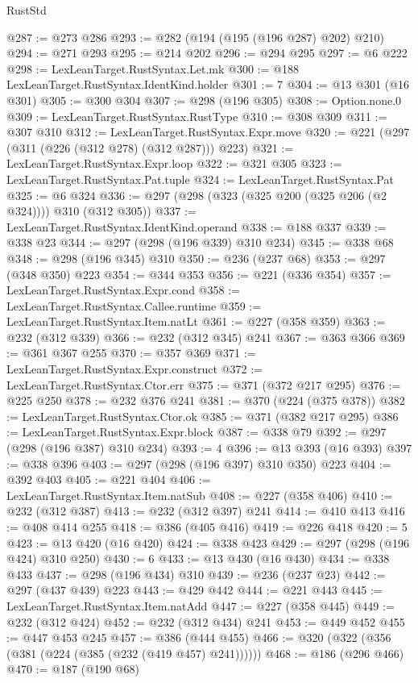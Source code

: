 \begin{lexlean}{RustStd}
\begin{coremodule}
@287 := @273 @286
@293 := @282 (@194 (@195 (@196 @287) @202) @210)
@294 := @271 @293
@295 := @214 @202
@296 := @294 @295
@297 := @6 @222
@298 := LexLeanTarget.RustSyntax.Let.mk
@300 := @188 LexLeanTarget.RustSyntax.IdentKind.holder
@301 := 7
@304 := @13 @301 (@16 @301)
@305 := @300 @304
@307 := @298 (@196 @305)
@308 := Option.none.{0}
@309 := LexLeanTarget.RustSyntax.RustType
@310 := @308 @309
@311 := @307 @310
@312 := LexLeanTarget.RustSyntax.Expr.move
@320 := @221 (@297 (@311 (@226 (@312 @278) (@312 @287))) @223)
@321 := LexLeanTarget.RustSyntax.Expr.loop
@322 := @321 @305
@323 := LexLeanTarget.RustSyntax.Pat.tuple
@324 := LexLeanTarget.RustSyntax.Pat
@325 := @6 @324
@336 := @297 (@298 (@323 (@325 @200 (@325 @206 (@2 @324)))) @310 (@312 @305))
@337 := LexLeanTarget.RustSyntax.IdentKind.operand
@338 := @188 @337
@339 := @338 @23
@344 := @297 (@298 (@196 @339) @310 @234)
@345 := @338 @68
@348 := @298 (@196 @345) @310
@350 := @236 (@237 @68)
@353 := @297 (@348 @350) @223
@354 := @344 @353
@356 := @221 (@336 @354)
@357 := LexLeanTarget.RustSyntax.Expr.cond
@358 := LexLeanTarget.RustSyntax.Callee.runtime
@359 := LexLeanTarget.RustSyntax.Item.natLt
@361 := @227 (@358 @359)
@363 := @232 (@312 @339)
@366 := @232 (@312 @345) @241
@367 := @363 @366
@369 := @361 @367 @255
@370 := @357 @369
@371 := LexLeanTarget.RustSyntax.Expr.construct
@372 := LexLeanTarget.RustSyntax.Ctor.err
@375 := @371 (@372 @217 @295)
@376 := @225 @250
@378 := @232 @376 @241
@381 := @370 (@224 (@375 @378))
@382 := LexLeanTarget.RustSyntax.Ctor.ok
@385 := @371 (@382 @217 @295)
@386 := LexLeanTarget.RustSyntax.Expr.block
@387 := @338 @79
@392 := @297 (@298 (@196 @387) @310 @234)
@393 := 4
@396 := @13 @393 (@16 @393)
@397 := @338 @396
@403 := @297 (@298 (@196 @397) @310 @350) @223
@404 := @392 @403
@405 := @221 @404
@406 := LexLeanTarget.RustSyntax.Item.natSub
@408 := @227 (@358 @406)
@410 := @232 (@312 @387)
@413 := @232 (@312 @397) @241
@414 := @410 @413
@416 := @408 @414 @255
@418 := @386 (@405 @416)
@419 := @226 @418
@420 := 5
@423 := @13 @420 (@16 @420)
@424 := @338 @423
@429 := @297 (@298 (@196 @424) @310 @250)
@430 := 6
@433 := @13 @430 (@16 @430)
@434 := @338 @433
@437 := @298 (@196 @434) @310
@439 := @236 (@237 @23)
@442 := @297 (@437 @439) @223
@443 := @429 @442
@444 := @221 @443
@445 := LexLeanTarget.RustSyntax.Item.natAdd
@447 := @227 (@358 @445)
@449 := @232 (@312 @424)
@452 := @232 (@312 @434) @241
@453 := @449 @452
@455 := @447 @453 @245
@457 := @386 (@444 @455)
@466 := @320 (@322 (@356 (@381 (@224 (@385 (@232 (@419 @457) @241))))))
@468 := @186 (@296 @466)
@470 := @187 (@190 @68)

\end{coremodule}
\end{lexlean}
